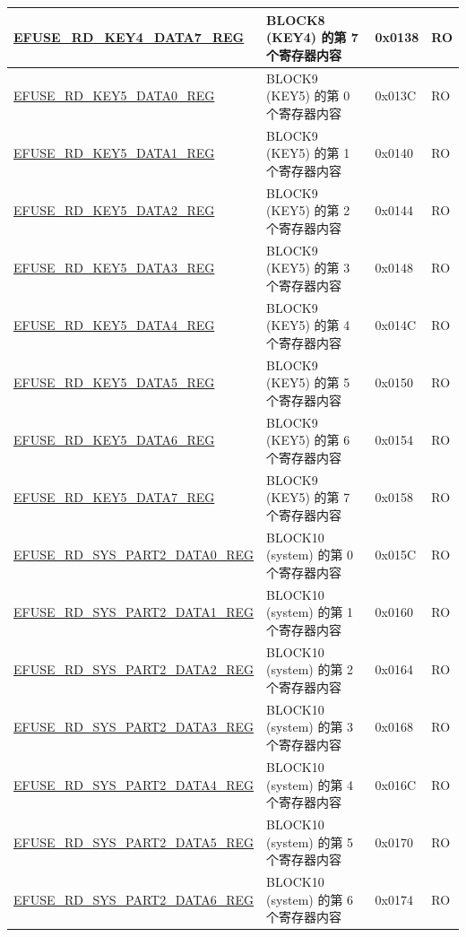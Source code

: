 \begin{longtable}{ | p{5.8cm} | p{7cm} | p{1.3cm} | p{1.2cm} | }
\hyperref[regdesc:EFUSERDKEY4DATA7REG]{EFUSE\_RD\_KEY4\_DATA7\_REG} & BLOCK8 (KEY4) 的第 7 个寄存器内容 & 0x0138 & RO \\ \hline
\hyperref[regdesc:EFUSERDKEY5DATA0REG]{EFUSE\_RD\_KEY5\_DATA0\_REG} & BLOCK9 (KEY5) 的第 0 个寄存器内容 & 0x013C & RO \\ \hline
\hyperref[regdesc:EFUSERDKEY5DATA1REG]{EFUSE\_RD\_KEY5\_DATA1\_REG} & BLOCK9 (KEY5) 的第 1 个寄存器内容 & 0x0140 & RO \\ \hline
\hyperref[regdesc:EFUSERDKEY5DATA2REG]{EFUSE\_RD\_KEY5\_DATA2\_REG} & BLOCK9 (KEY5) 的第 2 个寄存器内容 & 0x0144 & RO \\ \hline
\hyperref[regdesc:EFUSERDKEY5DATA3REG]{EFUSE\_RD\_KEY5\_DATA3\_REG} & BLOCK9 (KEY5) 的第 3 个寄存器内容 & 0x0148 & RO \\ \hline
\hyperref[regdesc:EFUSERDKEY5DATA4REG]{EFUSE\_RD\_KEY5\_DATA4\_REG} & BLOCK9 (KEY5) 的第 4 个寄存器内容 & 0x014C & RO \\ \hline
\hyperref[regdesc:EFUSERDKEY5DATA5REG]{EFUSE\_RD\_KEY5\_DATA5\_REG} & BLOCK9 (KEY5) 的第 5 个寄存器内容 & 0x0150 & RO \\ \hline
\hyperref[regdesc:EFUSERDKEY5DATA6REG]{EFUSE\_RD\_KEY5\_DATA6\_REG} & BLOCK9 (KEY5) 的第 6 个寄存器内容 & 0x0154 & RO \\ \hline
\hyperref[regdesc:EFUSERDKEY5DATA7REG]{EFUSE\_RD\_KEY5\_DATA7\_REG} & BLOCK9 (KEY5) 的第 7 个寄存器内容 & 0x0158 & RO \\ \hline
\hyperref[regdesc:EFUSERDSYSPART2DATA0REG]{EFUSE\_RD\_SYS\_PART2\_DATA0\_REG} & BLOCK10 (system) 的第 0 个寄存器内容 & 0x015C & RO \\ \hline
\hyperref[regdesc:EFUSERDSYSPART2DATA1REG]{EFUSE\_RD\_SYS\_PART2\_DATA1\_REG} & BLOCK10 (system) 的第 1 个寄存器内容 & 0x0160 & RO \\ \hline
\hyperref[regdesc:EFUSERDSYSPART2DATA2REG]{EFUSE\_RD\_SYS\_PART2\_DATA2\_REG} & BLOCK10 (system) 的第 2 个寄存器内容 & 0x0164 & RO \\ \hline
\hyperref[regdesc:EFUSERDSYSPART2DATA3REG]{EFUSE\_RD\_SYS\_PART2\_DATA3\_REG} & BLOCK10 (system) 的第 3 个寄存器内容 & 0x0168 & RO \\ \hline
\hyperref[regdesc:EFUSERDSYSPART2DATA4REG]{EFUSE\_RD\_SYS\_PART2\_DATA4\_REG} & BLOCK10 (system) 的第 4 个寄存器内容 & 0x016C & RO \\ \hline
\hyperref[regdesc:EFUSERDSYSPART2DATA5REG]{EFUSE\_RD\_SYS\_PART2\_DATA5\_REG} & BLOCK10 (system) 的第 5 个寄存器内容 & 0x0170 & RO \\ \hline
\hyperref[regdesc:EFUSERDSYSPART2DATA6REG]{EFUSE\_RD\_SYS\_PART2\_DATA6\_REG} & BLOCK10 (system) 的第 6 个寄存器内容 & 0x0174 & RO \\ \hline

\end{longtable}

